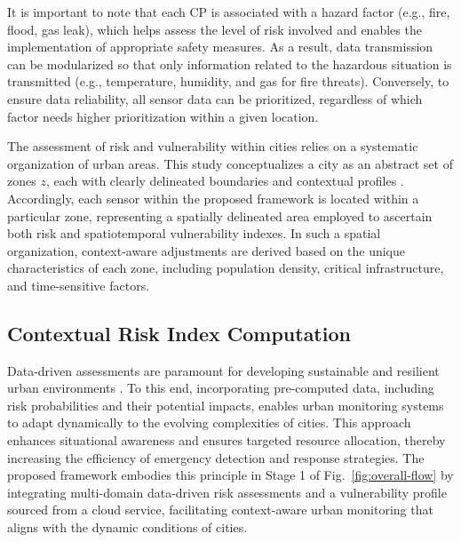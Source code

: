 \documentclass[conference]{IEEEtran}
\begin{document}
It is important to note that each CP is associated with a hazard factor (e.g., fire, flood, gas leak), which helps assess the level of risk involved and enables the implementation of appropriate safety measures. As a result, data transmission can be modularized so that only information related to the hazardous situation is transmitted (e.g., temperature, humidity, and gas for fire threats). Conversely, to ensure data reliability, all sensor data can be prioritized, regardless of which factor needs higher prioritization within a given location.

The assessment of risk and vulnerability within cities relies on a systematic organization of urban areas. This study conceptualizes a city as an abstract set of zones \( z \), each with clearly delineated boundaries and contextual profiles \cite{bittencourtDatadrivenClusteringApproach2024}. Accordingly, each sensor within the proposed framework is located within a particular zone, representing a spatially delineated area employed to ascertain both risk and spatiotemporal vulnerability indexes. %
In such a spatial organization, context-aware adjustments are derived based on the unique characteristics of each zone, including population density, critical infrastructure, and time-sensitive factors.

\subsection{Contextual Risk Index Computation}

Data-driven assessments are paramount for developing sustainable and resilient urban environments \cite{costaAchievingSustainableSmart2024}. To this end, incorporating pre-computed data, including risk probabilities and their potential impacts, enables urban monitoring systems to adapt dynamically to the evolving complexities of cities. This approach enhances situational awareness and ensures targeted resource allocation, thereby increasing the efficiency of emergency detection and response strategies. The proposed framework embodies this principle in Stage 1 of Fig.~\ref{fig:overall-flow} by integrating multi-domain data-driven risk assessments and a vulnerability profile sourced from a cloud service, facilitating context-aware urban monitoring that aligns with the dynamic conditions of cities.
\end{document}
